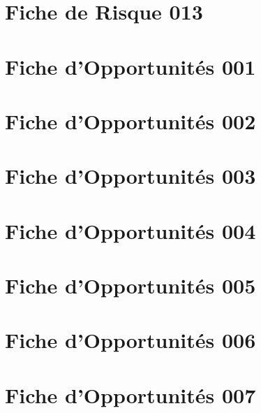 \documentclass[asi]{picINSA}
\begin{document}
\chapter*{Fiche de Risque 013}



\chapter*{Fiche d'Opportunités 001}

\chapter*{Fiche d'Opportunités 002}

\chapter*{Fiche d'Opportunités 003}

\chapter*{Fiche d'Opportunités 004}

\chapter*{Fiche d'Opportunités 005}

\chapter*{Fiche d'Opportunités 006}

\chapter*{Fiche d'Opportunités 007}

\end{document}
